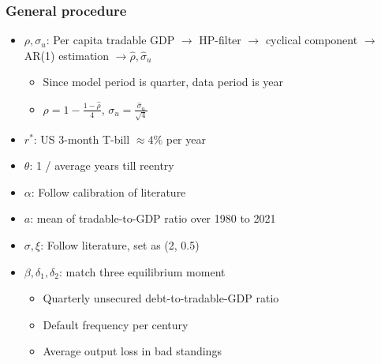 \documentclass[mathserif]{beamer}
\begin{document}
   \begin{frame}
    \frametitle{General procedure}
    \begin{itemize}
        \item $\rho, \sigma_u$:  Per capita tradable GDP $\rightarrow$ HP-filter $\rightarrow$ cyclical component $\rightarrow$ AR(1) estimation $\rightarrow \hat{\rho}, \hat{\sigma}_u$
        \begin{itemize}
            \item Since model period is quarter, data period is year
            \item $\rho = 1 - \frac{1 - \hat{\rho}}{4}$, $\sigma_u = \frac{\hat{\sigma}_u}{\sqrt{4}}$
        \end{itemize}
        \item $r^*$: US 3-month T-bill $\approx 4\%$ per year
        \item $\theta$: 1 / average years till reentry
        \item $\alpha$: Follow calibration of literature
        \item $a$: mean of tradable-to-GDP ratio over 1980 to 2021
        \item $\sigma, \xi$: Follow literature, set as (2, 0.5)
        \item $\beta, \delta_1, \delta_2$: match three equilibrium moment
        \begin{itemize}
            \item Quarterly unsecured debt-to-tradable-GDP ratio
            \item Default frequency per century
            \item Average output loss in bad standings
        \end{itemize}
    \end{itemize}
   \end{frame}
\end{document}
